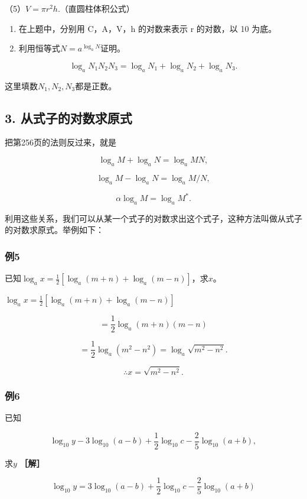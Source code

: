 （5）\(V = \pi r^2 h.\)（直圆柱体积公式）

\begin{enumerate}[start=4]
\item
  在上题中，分别用 C，A，V，h 的对数来表示 r 的对数，以 10 为底。
\item
  利用恒等式\(N = a^{\log_{a} N}\)证明。
\end{enumerate}

\[
\log_{a} N_{1} N_{2} N_{3} = \log_{a} N_{1} + \log_{a} N_{2} + \log_{a} N_{3}.
\]

这里填数\(N_{1}, N_{2}, N_{3}\)都是正数。

\subsection{3. 从式子的对数求原式}

把第256页的法则反过来，就是

\[
\log_{a} M + \log_{a} N = \log_{a} M N,
\]

\[
\log_{a} M - \log_{a} N = \log_{a} M / N,
\]

\[
\alpha \log_{a} M = \log_{a} M^{*}.
\]

利用这些关系，我们可以从某一个式子的对数求出这个式子，这种方法叫做从式子的对数求原式。举例如下：

\subsubsection{例5}

已知\(\log_a x = \frac{1}{2} [\log_a(m + n) + \log_a(m - n)]\)，求\(x\)。

\(\log_a x = \frac{1}{2} [\log_a(m + n) + \log_a(m - n)]\)

\[
= \frac{1}{2} \log_{a} (m + n) (m - n)
\]

\[
= \frac{1}{2} \log_{a} (m^{2} - n^{2}) = \log_{a} \sqrt{m^{2} - n^{2}}.
\]

\[
\therefore x = \sqrt{m^{2} - n^{2}}.
\]

\subsubsection{例6}

已知

\[
\log_{10} y - 3 \log_{10} (a - b) + \frac{1}{2} \log_{10} c - \frac{2}{5} \log_{10} (a + b),
\]

求\(y\) \textbf{［解］}

\[
\log_{10} y = 3 \log_{10} (a - b) + \frac{1}{2} \log_{10} c - \frac{2}{5} \log_{10} (a + b)
\]

